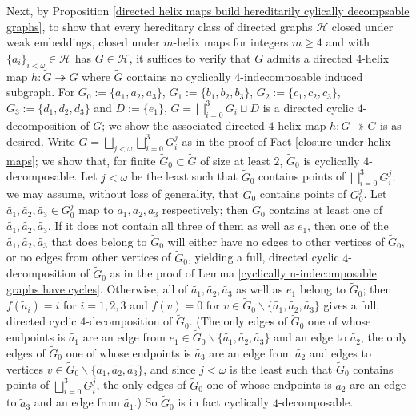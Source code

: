 \documentclass{amsart}
\theoremstyle{definition}
\theoremstyle{remark}
\numberwithin{equation}{section}
\begin{document}
Next, by Proposition \ref{directed helix maps build hereditarily cylically decompsable graphs}, to show that every hereditary class of directed graphs $\mathcal{H}$ closed under weak embeddings, closed under $m$-helix maps for integers $m \geq 4$ and with $\{a_{i}\}_{i < \omega} \in \mathcal{H}$ has $G \in \mathcal{H}$, it suffices to verify that $G$ admits a directed $4$-helix map $h: \tilde{G} \twoheadrightarrow G$ where $\tilde{G}$ contains no cyclically $4$-indecomposable induced subgraph. For $G_{0} :=\{a_{1}, a_{2}, a_{3}\} $, $G_{1} :=\{b_{1}, b_{2}, b_{3}\} $, $G_{2} :=\{c_{1}, c_{2}, c_{3}\} $, $G_{3} :=\{d_{1}, d_{2}, d_{3}\} $ and $D := \{e_{1}\}$,  $G = \bigsqcup^{3}_{i=0} G_{i} \sqcup D$ is a directed cyclic $4$-decomposition of $G$; we show the associated directed $4$-helix map  $h: \tilde{G} \twoheadrightarrow G$ is as desired. Write $\tilde{G} = \bigsqcup_{j < \omega}\bigsqcup^{3}_{i =0} G^{j}_{i}$ as in the proof of Fact \ref{closure under helix maps}; we show that, for finite $\tilde{G}_{0} \subset \tilde{G}$ of size at least $2$, $\tilde{G}_{0}$ is cyclically $4$-decomposable. Let $j < \omega$ be the least such that $\tilde{G}_{0}$ contains points of $\bigsqcup^{3}_{i =0} G^{j}_{i}$; we may assume, without loss of generality, that $\tilde{G}_{0}$ contains points of $G^{j}_{0}$. Let $\tilde{a_{1}}, \tilde{a_{2}}, \tilde{a_{3}} \in G^{j}_{0}$ map to $a_{1}, a_{2}, a_{3}$ respectively; then $\tilde{G}_{0}$ contains at least one of $\tilde{a_{1}}, \tilde{a_{2}}, \tilde{a_{3}}$. If it does not contain all three of them as well as $e_{1}$, then one of the $\tilde{a_{1}}, \tilde{a_{2}}, \tilde{a_{3}}$ that does belong to $\tilde{G}_{0}$ will either have no edges to other vertices of $\tilde{G}_{0}$, or no edges from other vertices of $\tilde{G}_{0}$, yielding a full, directed cyclic $4$-decomposition of $\tilde{G}_{0}$ as in the proof of Lemma \ref{cyclically n-indecomposable graphs have cycles}. Otherwise, all of $\tilde{a_{1}}, \tilde{a_{2}}, \tilde{a_{3}}$ as well as $e_{1}$ belong to $\tilde{G}_{0}$; then $f(\tilde{a}_{i}) = i$ for $i = 1, 2, 3$ and $f(v) = 0$ for $v \in \tilde{G}_{0} \backslash \{\tilde{a_{1}}, \tilde{a_{2}}, \tilde{a_{3}}\}$ gives a full, directed cyclic $4$-decomposition of $\tilde{G}_{0}$. (The only edges of $\tilde{G}_{0}$ one of whose endpoints is $\tilde{a_{1}}$ are an edge from $e_{1} \in \tilde{G}_{0} \backslash \{\tilde{a_{1}}, \tilde{a_{2}}, \tilde{a_{3}}\}$ and an edge to $\tilde{a_{2}}$, the only edges of $\tilde{G}_{0}$ one of whose endpoints is $\tilde{a_{3}}$ are an edge from $\tilde{a_{2}}$ and edges to vertices $v \in \tilde{G}_{0} \backslash \{\tilde{a_{1}}, \tilde{a_{2}}, \tilde{a_{3}}\}$, and since $j < \omega$ is the least such that $\tilde{G}_{0}$ contains points of $\bigsqcup^{3}_{i =0} G^{j}_{i}$, the only edges of $\tilde{G}_{0}$ one of whose endpoints is $\tilde{a_{2}}$ are an edge to $\tilde{a}_{3}$ and an edge from $\tilde{a_{1}}$.) So $\tilde{G}_{0}$ is in fact cyclically $4$-decomposable.
\end{document}
